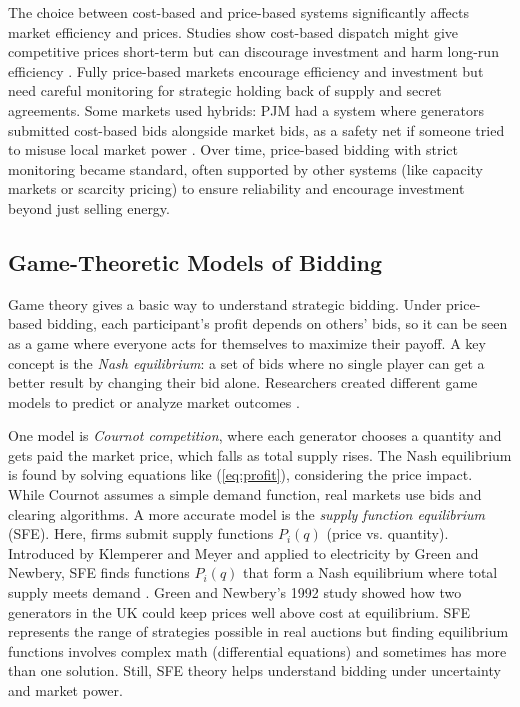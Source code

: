 \documentclass[conference]{IEEEtran}
\begin{document}
The choice between cost-based and price-based systems significantly affects market efficiency and prices. Studies show cost-based dispatch might give competitive prices short-term but can discourage investment and harm long-run efficiency \cite{Newbery2002}. Fully price-based markets encourage efficiency and investment but need careful monitoring for strategic holding back of supply and secret agreements. Some markets used hybrids: PJM had a system where generators submitted cost-based bids alongside market bids, as a safety net if someone tried to misuse local market power \cite{PJMManualXX_Historical}. Over time, price-based bidding with strict monitoring became standard, often supported by other systems (like capacity markets or scarcity pricing) to ensure reliability and encourage investment beyond just selling energy.

\subsection{Game-Theoretic Models of Bidding}

Game theory gives a basic way to understand strategic bidding. Under price-based bidding, each participant's profit depends on others' bids, so it can be seen as a game where everyone acts for themselves to maximize their payoff. A key concept is the \textit{Nash equilibrium}: a set of bids where no single player can get a better result by changing their bid alone. Researchers created different game models to predict or analyze market outcomes \cite{Ferrero1997, Torre2002}.

One model is \textit{Cournot competition}, where each generator chooses a quantity and gets paid the market price, which falls as total supply rises. The Nash equilibrium is found by solving equations like (\ref{eq:profit}), considering the price impact. While Cournot assumes a simple demand function, real markets use bids and clearing algorithms. A more accurate model is the \textit{supply function equilibrium} (SFE). Here, firms submit supply functions $P_i(q)$ (price vs. quantity). Introduced by Klemperer and Meyer and applied to electricity by Green and Newbery, SFE finds functions $P_i(q)$ that form a Nash equilibrium where total supply meets demand \cite{Green1992, Bolle1992}. Green and Newbery's 1992 study showed how two generators in the UK could keep prices well above cost at equilibrium. SFE represents the range of strategies possible in real auctions but finding equilibrium functions involves complex math (differential equations) and sometimes has more than one solution. Still, SFE theory helps understand bidding under uncertainty and market power.
\end{document}
